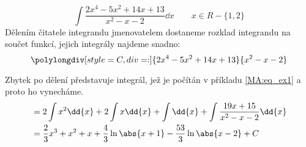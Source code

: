 \begin{mdframed}[style=mdexam]
  \begin{example}\label{mai:exam016}
    \begin{equation}\label{mai:int_ex_02}
      \int{\frac{2x^4-5x^2+14x+13}{x^2-x-2}\dd{x}} \qquad x\in R - \{1,2\}
    \end{equation}
    Dělením čitatele integrandu jmenovatelem dostaneme rozklad integrandu na součet funkcí, jejich 
    integrály najdeme snadno:
    \begin{equation*}
      \polylongdiv[style=C,div=:]{2x^4-5x^2+14x+13}{x^2-x-2}
    \end{equation*}

    Zbytek po dělení představuje integrál, jež je počítán v příkladu \ref{MA:eq_ex1} a proto ho 
    vynecháme. 
    \begin{align*}
       &= 2\int x^2\dd{x} + 2\int x\dd{x} + \int\dd{x} + \int\frac{19x+15}{x^2-x-2}\dd{x}     \\
       &= \frac{2}{3}x^3 + x^2 + x + \frac{4}{3}\ln\abs{x+1} - \frac{53}{3}\ln\abs{x-2} + C 
    \end{align*}
  \end{example}
\end{mdframed}